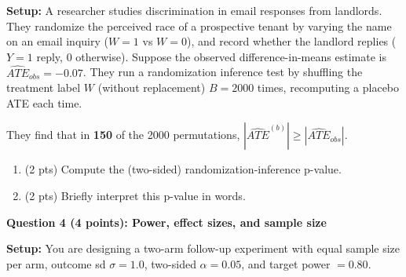 \documentclass[12pt]{article}
\begin{document}
\noindent\textbf{Setup:} A researcher studies discrimination in email responses from landlords.
They randomize the perceived race of a prospective tenant by varying the name on an email inquiry ($W=1$ vs $W=0$),
and record whether the landlord replies ($Y=1$ reply, $0$ otherwise).
Suppose the observed difference-in-means estimate is $\widehat{ATE}_{obs}=-0.07$.
They run a randomization inference test by shuffling the treatment label $W$ (without replacement) $B=2000$ times, recomputing a placebo ATE each time.

\noindent They find that in \textbf{150} of the 2000 permutations, $|\widehat{ATE}^{(b)}|\ge |\widehat{ATE}_{obs}|$.

\begin{enumerate}[label=3\alph*)]
  \item (2 pts) Compute the (two-sided) randomization-inference p-value.
  \item (2 pts) Briefly interpret this p-value in words.
\end{enumerate}

\vspace{1.0em}
\noindent\textbf{Question 4 (4 points): Power, effect sizes, and sample size}

\noindent\textbf{Setup:} You are designing a two-arm follow-up experiment with equal sample size per arm,
outcome sd $\sigma=1.0$, two-sided $\alpha=0.05$, and target power $=0.80$.
\end{document}
